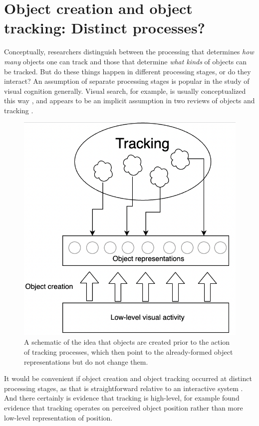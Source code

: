 \documentclass[
]{book}
\begin{document}
\hypertarget{object-creation-and-object-tracking-distinct-processes}{%
\section{Object creation and object tracking: Distinct processes?}\label{object-creation-and-object-tracking-distinct-processes}}

Conceptually, researchers distinguish between the processing that determines \emph{how many} objects one can track and those that determine \emph{what kinds} of objects can be tracked. But do these things happen in different processing stages, or do they interact? An assumption of separate processing stages is popular in the study of visual cognition generally. Visual search, for example, is usually conceptualized this way \citep{wolfePreattentiveObjectFiles1997, nakayamaVisualSurfaceRepresentation1995}, and appears to be an implicit assumption in two reviews of objects and tracking \citep{schollObjectsAttentionState2001, pylyshynSeeingVisualizingIt2006}.

\begin{figure}
\includegraphics[width=0.3\linewidth]{imagesForRmd/flowDiagrams/objectCreationTrackingSeparateDiagram} \caption{A schematic of the idea that objects are created prior to the action of tracking processes, which then point to the already-formed object representations but do not change them.}\label{fig:simpleArchitecture}
\end{figure}

It would be convenient if object creation and object tracking occurred at distinct processing stages, as that is straightforward relative to an interactive system \citep{simonSciencesArtificialReissue1969, sternbergDiscoveryProcessingStages1969}. And there certainly is evidence that tracking is high-level, for example \citet{maechlerAttentionalTrackingTakes2021} found evidence that tracking operates on perceived object position rather than more low-level representation of position.
\end{document}
